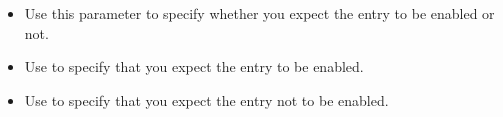 
\begin{itemize}
\item Use this parameter to specify whether you expect the entry to be enabled or not. 
\item Use  to specify that you expect the entry to be enabled.
\item Use  to specify that you expect the entry not to be enabled.
\end{itemize}
